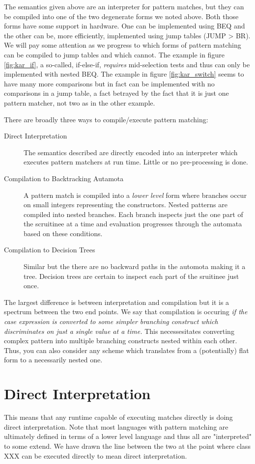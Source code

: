 \documentclass[acmsmall]{acmart}
\begin{document}
The semantics given above are an interpreter for pattern matches, but they can be compiled into one of the two degenerate forms we noted above.  Both those forms have some support in hardware.  One can be implemented using BEQ and the other can be, more efficiently, implemented using jump tables (JUMP > BR).  We will pay some attention as we progress to which forms of pattern matching can be compiled to jump tables and which cannot.  The example in figure \ref{fig:kar_if}, a so-called, if-else-if, \emph{requires} mid-selection tests and thus can only be implemented with nested BEQ.  The example in figure \ref{fig:kar_switch} seems to have many more comparisons but in fact can be implemented with no comparisons in a jump table, a fact betrayed by the fact that it is just one pattern matcher, not two as in the other example.

There are broadly three ways to compile/execute pattern matching:
\begin{description}
    \item[Direct Interpretation]  The semantics described are directly encoded into an interpreter which executes pattern matchers at run time. Little or no pre-processing is done.
    \item[Compilation to Backtracking Autamota] A pattern match is compiled into a \emph{lower level} form where branches occur on small integers representing the constructors.  Nested patterns are compiled into nested branches.  Each branch inspects just the one part of the scruitinee at a time and evaluation progresses through the automata based on these conditions.
    \item[Compilation to Decision Trees] Similar but the there are no backward paths in the automota making it a tree.  Decision trees are certain to inspect each part of the sruitinee just once.
\end{description}

The largest difference is between interpretation and compilation but it is a spectrum between the two end points.  We say that compilation is occuring \emph{if the case expression is converted to some simpler branching construct which discriminates on just a single value at a time.}  This necessesitates converting complex pattern into multiple branching constructs nested within each other.  Thus, you can also consider any scheme which translates from a (potentially) flat form to a necessarily nested one.

\section{Direct Interpretation}
This means that any runtime capable of executing matches directly is doing direct interpretation. Note that most languages with pattern matching are ultimately defined in terms of a lower level language and thus all are "interpreted" to some extend.  We have drawn the line between the two at the point where class XXX can be executed directly to mean direct interpretation.
\end{document}
